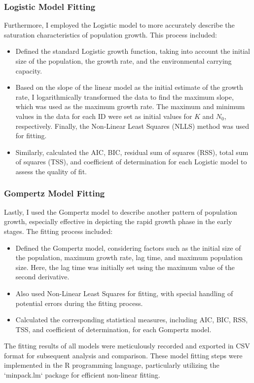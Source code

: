 \documentclass[11pt]{article}
\begin{document}
\subsubsection{Logistic Model Fitting}
Furthermore, I employed the Logistic model to more accurately describe the saturation characteristics of population growth. This process included:
\begin{itemize}
\item Defined the standard Logistic growth function, taking into account the initial size of the population, the growth rate, and the environmental carrying capacity.
\item Based on the slope of the linear model as the initial estimate of the growth rate, I logarithmically transformed the data to find the maximum slope, which was used as the maximum growth rate. The maximum and minimum values in the data for each ID were set as initial values for \(K\) and \(N_0\), respectively. Finally, the Non-Linear Least Squares (NLLS) method was used for fitting.
\item Similarly, calculated the AIC, BIC, residual sum of squares (RSS), total sum of squares (TSS), and coefficient of determination for each Logistic model to assess the quality of fit.
\end{itemize}


\subsubsection{Gompertz Model Fitting}
Lastly, I used the Gompertz model to describe another pattern of population growth, especially effective in depicting the rapid growth phase in the early stages. The fitting process included:
\begin{itemize}
\item Defined the Gompertz model, considering factors such as the initial size of the population, maximum growth rate, lag time, and maximum population size. Here, the lag time was initially set using the maximum value of the second derivative.
\item Also used Non-Linear Least Squares for fitting, with special handling of potential errors during the fitting process.
\item Calculated the corresponding statistical measures, including AIC, BIC, RSS, TSS, and coefficient of determination, for each Gompertz model.
\end{itemize}

The fitting results of all models were meticulously recorded and exported in CSV format for subsequent analysis and comparison. These model fitting steps were implemented in the R programming language, particularly utilizing the `minpack.lm` package for efficient non-linear fitting.
\end{document}
